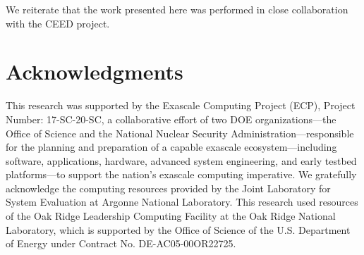 \documentclass{ecpreportv2}
\begin{document}
We reiterate  that the work presented here was performed in close collaboration with the CEED project.







\section*{Acknowledgments}

This research was supported by the Exascale Computing Project (ECP), Project
Number: 17-SC-20-SC, a collaborative effort of two DOE organizations---the
Office of Science and the National Nuclear Security Administration---responsible
for the planning and preparation of a capable exascale ecosystem---including
software, applications, hardware, advanced system engineering, and early testbed
platforms---to support the nation's exascale computing imperative. We gratefully
acknowledge the computing resources provided by the Joint Laboratory for System
Evaluation at Argonne National Laboratory. This research used resources of the
Oak Ridge Leadership Computing Facility at the Oak Ridge National Laboratory,
which is supported by the Office of Science of the U.S. Department of Energy
under Contract No. DE-AC05-00OR22725.






\end{document}
